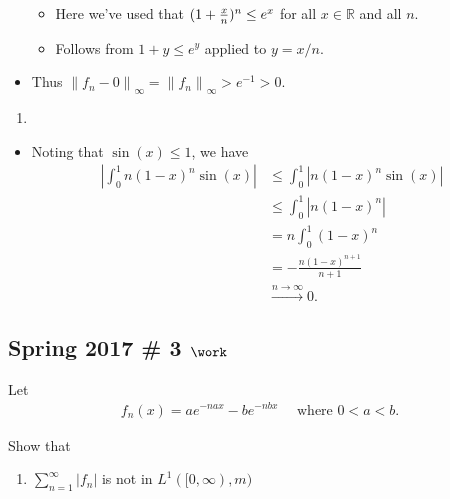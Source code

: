 \begin{solution}
\begin{itemize}
  \begin{itemize}
  \tightlist
  \item
    Here we've used that \((1 + {x\over n})^n \leq e^x\) for all
    \(x\in {\mathbb{R}}\) and all \(n\).
  \item
    Follows from \(1+y \leq e^y\) applied to \(y = x/n\).
  \end{itemize}
\item
  Thus
  \({\left\lVert {f_n - 0} \right\rVert}_\infty = {\left\lVert {f_n} \right\rVert}_\infty > e^{-1} > 0\).
\end{itemize}

\begin{enumerate}
\def\labelenumi{\alph{enumi}.}
\setcounter{enumi}{1}
\tightlist
\item
\end{enumerate}


\begin{itemize}
\tightlist
\item
  Noting that \(\sin(x) \leq 1\), we have
  \begin{align*}
  {\left\lvert {\int_0^1  n(1-x)^{n} \sin(x)} \right\rvert} 
  &\leq \int_0^1  {\left\lvert {n(1-x)^n \sin(x)} \right\rvert} \\
  &\leq \int_0^1  {\left\lvert {n (1-x)^n} \right\rvert}  \\
  &= n\int_0^1 (1-x)^n \\
  &= -\frac{n(1-x)^{n+1}}{n+1} \\
  &\overset{n\to\infty}\longrightarrow 0
  .\end{align*}
\end{itemize}

\end{solution}

\hypertarget{spring-2017-3-work}{%
\subsection{\texorpdfstring{Spring 2017 \# 3
\(\work\)}{Spring 2017 \# 3 \textbackslash work}}\label{spring-2017-3-work}}

Let
\begin{align*}
f_{n}(x) = a e^{-n a x} - b e^{-n b x} \quad \text{ where } 0 < a < b.
\end{align*}

Show that

\begin{enumerate}
\def\labelenumi{\alph{enumi}.}
\tightlist
\item
  \(\sum_{n=1}^{\infty} \left|f_{n}\right|\) is not in
  \(L^{1}([0, \infty), m)\)
\end{enumerate}

